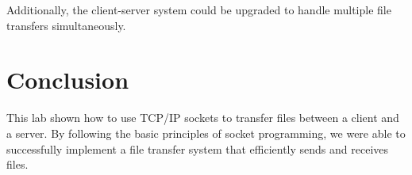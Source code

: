 \documentclass[a4paper,12pt]{article}
\begin{document}
Additionally, the client-server system could be upgraded to handle multiple file transfers simultaneously.

\section{Conclusion}
This lab shown how to use TCP/IP sockets to transfer files between a client and a server. By following the basic principles of socket programming, we were able to successfully implement a file transfer system that efficiently sends and receives files. 
\end{document}
